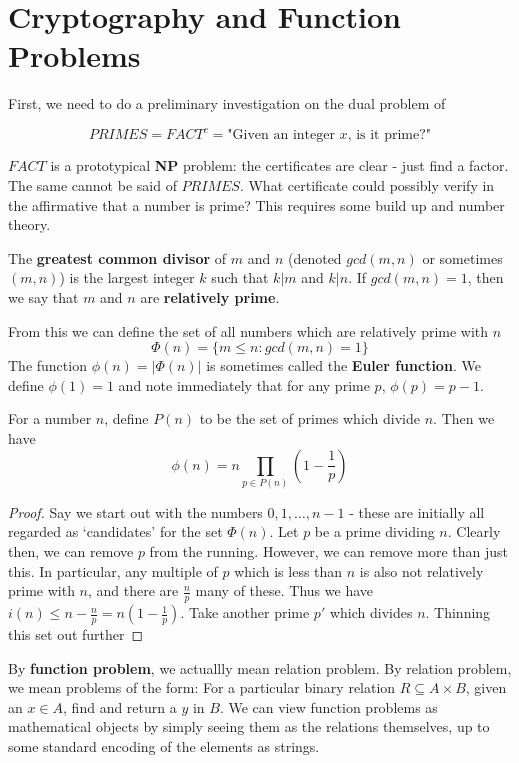 \section{Cryptography and Function Problems}
First, we need to do a preliminary investigation on the dual problem of 

\[PRIMES = FACT^c = \textrm{"Given an integer $x$, is it prime?"}\]

$FACT$ is a prototypical \textbf{NP} problem: the certificates are clear - just find a factor. The same cannot be said of $PRIMES$. What certificate could possibly verify in the affirmative that a number is prime? This requires some build up and number theory. 

\begin{definition}
    The \textbf{greatest common divisor} of $m$ and $n$ (denoted $gcd(m,n)$ or sometimes $(m,n)$) is the largest integer $k$ such that $k | m$ and $k | n$. If $gcd(m,n) = 1$, then we say that $m$ and $n$ are \textbf{relatively prime}.
\end{definition}

From this we can define the set of all numbers which are relatively prime with $n$
\[ \Phi(n) = \{ m \leq n: gcd(m,n) = 1 \} \]
The function $\phi(n) = |\Phi(n)|$ is sometimes called the \textbf{Euler function}. We define $\phi(1) = 1$ and note immediately that for any prime $p$, $\phi(p)=p-1$. 

\begin{fact}
    For a number $n$, define $P(n)$ to be the set of primes which divide $n$. Then we have
    \[ \phi(n) = n\prod_{p \in P(n)} (1-\frac{1}{p}) \]
\end{fact}

\begin{proof}
    Say we start out with the numbers $0,1,\ldots, n-1$ - these are initially all regarded as `candidates' for the set $\Phi(n)$. Let $p$ be a prime dividing $n$. Clearly then, we can remove $p$ from the running. However, we can remove more than just this. In particular, any multiple of $p$ which is less than $n$ is also not relatively prime with $n$, and there are $\frac{n}{p}$ many of these. Thus we have $i(n) \leq n-\frac{n}{p} = n(1-\frac{1}{p})$. Take another prime $p'$ which divides $n$. Thinning this set out further 
\end{proof}

\begin{definition}
    By \textbf{function problem}, we actuallly mean relation problem. By relation problem, we mean problems of the form: For a particular binary relation $R \subseteq A \times B$, given an $x \in A$, find and return a $y$ in $B$. We can view function problems as mathematical objects by simply seeing them as the relations themselves, up to some standard encoding of the elements as strings. 
\end{definition}

